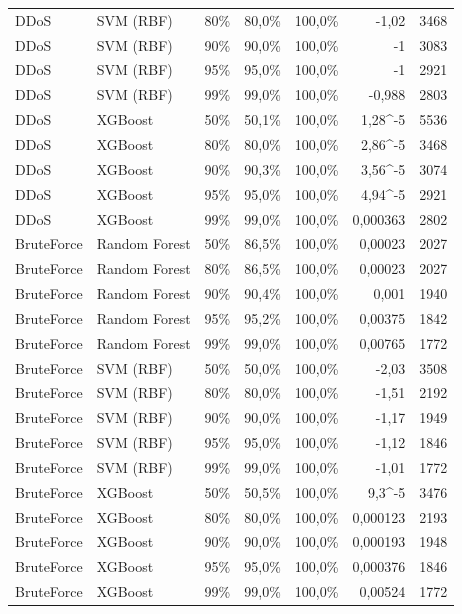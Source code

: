 {\begin{tabular}{@{}llrrrrr@{}}
\rowcolor{rowalt}DDoS & SVM (RBF) & 80\% & 80,0\% & 100,0\% & -1,02 & 3468\\
DDoS & SVM (RBF) & 90\% & 90,0\% & 100,0\% & -1 & 3083\\
\rowcolor{rowalt}DDoS & SVM (RBF) & 95\% & 95,0\% & 100,0\% & -1 & 2921\\
DDoS & SVM (RBF) & 99\% & 99,0\% & 100,0\% & -0,988 & 2803\\
\rowcolor{rowalt}DDoS & XGBoost & 50\% & 50,1\% & 100,0\% & 1,28\cdot10^{-5} & 5536\\
DDoS & XGBoost & 80\% & 80,0\% & 100,0\% & 2,86\cdot10^{-5} & 3468\\
\rowcolor{rowalt}DDoS & XGBoost & 90\% & 90,3\% & 100,0\% & 3,56\cdot10^{-5} & 3074\\
DDoS & XGBoost & 95\% & 95,0\% & 100,0\% & 4,94\cdot10^{-5} & 2921\\
\rowcolor{rowalt}DDoS & XGBoost & 99\% & 99,0\% & 100,0\% & 0,000363 & 2802\\
BruteForce & Random Forest & 50\% & 86,5\% & 100,0\% & 0,00023 & 2027\\
\rowcolor{rowalt}BruteForce & Random Forest & 80\% & 86,5\% & 100,0\% & 0,00023 & 2027\\
BruteForce & Random Forest & 90\% & 90,4\% & 100,0\% & 0,001 & 1940\\
\rowcolor{rowalt}BruteForce & Random Forest & 95\% & 95,2\% & 100,0\% & 0,00375 & 1842\\
BruteForce & Random Forest & 99\% & 99,0\% & 100,0\% & 0,00765 & 1772\\
\rowcolor{rowalt}BruteForce & SVM (RBF) & 50\% & 50,0\% & 100,0\% & -2,03 & 3508\\
BruteForce & SVM (RBF) & 80\% & 80,0\% & 100,0\% & -1,51 & 2192\\
\rowcolor{rowalt}BruteForce & SVM (RBF) & 90\% & 90,0\% & 100,0\% & -1,17 & 1949\\
BruteForce & SVM (RBF) & 95\% & 95,0\% & 100,0\% & -1,12 & 1846\\
\rowcolor{rowalt}BruteForce & SVM (RBF) & 99\% & 99,0\% & 100,0\% & -1,01 & 1772\\
BruteForce & XGBoost & 50\% & 50,5\% & 100,0\% & 9,3\cdot10^{-5} & 3476\\
\rowcolor{rowalt}BruteForce & XGBoost & 80\% & 80,0\% & 100,0\% & 0,000123 & 2193\\
BruteForce & XGBoost & 90\% & 90,0\% & 100,0\% & 0,000193 & 1948\\
\rowcolor{rowalt}BruteForce & XGBoost & 95\% & 95,0\% & 100,0\% & 0,000376 & 1846\\
BruteForce & XGBoost & 99\% & 99,0\% & 100,0\% & 0,00524 & 1772\\
\bottomrule
\end{tabular}}%
